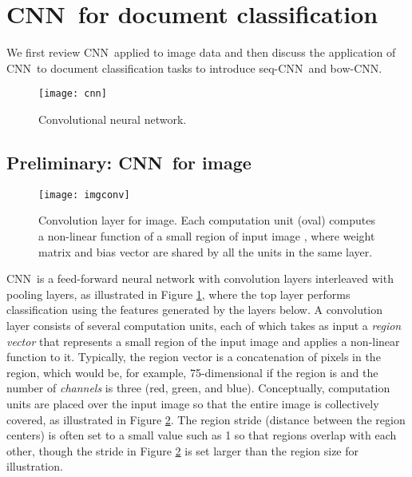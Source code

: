\documentclass[11pt,letterpaper]{article}
\newcommand{\cnn}{CNN}
\newcommand{\scnn}{seq-CNN}
\newcommand{\bcnn}{bow-CNN}
\begin{document}
\section{\cnn\ for document classification}
\label{sec:method}
 
We first review \cnn\ applied to image data and then 
discuss the application of \cnn\ to document classification tasks 
to introduce \scnn\ and \bcnn.  

\begin{figure}
\centering
\texttt{[image: cnn]}
\vspace{-0.1in}
\caption{\label{fig:cnn} \small
Convolutional neural network.  }
\end{figure}


\subsection{Preliminary: \cnn\ for image}
\label{sec:cnn-image}

\begin{figure}
\centering
\texttt{[image: imgconv]}
\vspace{-0.1in}
\caption{\label{fig:imgconv} \footnotesize Convolution layer for image.  
Each computation unit (oval) computes a non-linear function 
 of a small region  of input image , 
where weight matrix  and bias vector  are shared by all the units in the same layer.
}
\end{figure}


\cnn\ is a feed-forward neural network with convolution layers interleaved with  
pooling layers, as illustrated in Figure \ref{fig:cnn}, where 
the top layer performs classification using the features generated by the 
layers below. A convolution layer consists of several computation units, each of which 
takes as input a {\em region vector} that represents a small region of the input image 
and applies a non-linear function to it.  
Typically, the region vector is a concatenation of pixels in the region, which 
would be, for example, 75-dimensional if the region is  and the number of {\em channels} 
is three (red, green, and blue).  
Conceptually, computation units are placed over the input image so that the entire image is 
collectively covered, as illustrated in Figure \ref{fig:imgconv}.  
The region stride (distance between the region centers) is often set to a small value such as 1 
so that regions overlap with each other, 
though the stride in Figure \ref{fig:imgconv} is set larger than the region size for illustration.  
\end{document}
